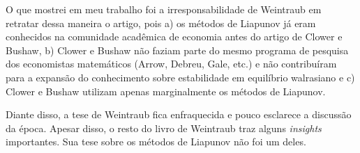 \documentclass[
	12pt,				%
	openright,			%
	twoside,			%
	a4paper,			%
	english,			%
	french,				%
	spanish,			%
	brazil				%
	]{abntex2}
\begin{document}
O que mostrei em meu trabalho foi a irresponsabilidade de Weintraub em retratar
dessa maneira o artigo, pois a) os métodos de Liapunov já eram conhecidos na comunidade
acadêmica de economia antes do artigo de Clower e Bushaw, b) Clower e Bushaw não faziam
parte do mesmo programa de pesquisa dos economistas matemáticos (Arrow, Debreu, Gale, etc.) e
não contribuíram para a expansão do conhecimento sobre estabilidade em equilíbrio walrasiano e c)
Clower e Bushaw utilizam apenas marginalmente os métodos de Liapunov.

Diante disso, a tese de Weintraub fica enfraquecida e pouco esclarece a discussão
da época. Apesar disso, o resto do livro de Weintraub traz alguns \textit{insights} importantes.
Sua tese sobre os métodos de Liapunov não foi um deles.

\postextual



%
%










\end{document}
